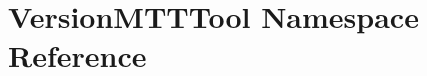 \hypertarget{namespaceVersionMTTTool}{\section{Version\-M\-T\-T\-Tool Namespace Reference}
\label{namespaceVersionMTTTool}
}
